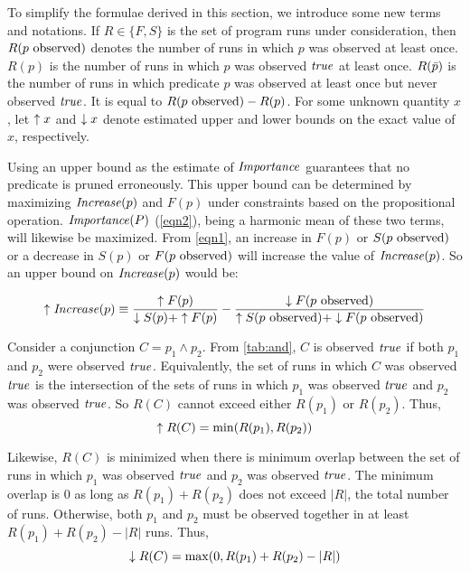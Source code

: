 To simplify the formulae derived in this section, we introduce some new terms and
notations.  If $R \in \{F, S\}$ is the set of program runs under consideration, then
$R(\text{$p$ observed})$ denotes the number of runs in which $p$ was observed at least
once.  $R(p)$ is the number of runs in which $p$ was observed $\mathit{true}$ at least once.
$R(\text{$\bar{p}$})$ is the number of runs in which predicate $p$ was observed
at least once but never observed $\mathit{true}$.  It is equal to $R(\text{$p$ observed}) - R(p)$.
For some unknown quantity $x$, let $\uparrow x$ and $\downarrow x$ denote estimated upper
and lower bounds on the exact value of $x$, respectively.

Using an upper bound as the estimate of $\mathit{Importance}$ guarantees that no
predicate is pruned erroneously.  This upper bound can be determined by maximizing
$\mathit{Increase}(p)$ and $F(p)$ under constraints based on the propositional operation.
$\mathit{Importance}(P)$ (\autoref{eqn2}), being a harmonic mean of these two terms, will
likewise be maximized.  From \autoref{eqn1}, an increase in $F(p)$ or $S(\text{$p$ observed})$
or a decrease in $S(p)$ or $F(\text{$p$ observed})$ will increase the value of $\mathit{Increase}(p)$.
So an upper bound on $\mathit{Increase}(p)$ would be:

\begin{equation}
\label{eqn3}
\uparrow\mathit{Increase}(p) \equiv
\frac{\uparrow F(p)}{\downarrow S(p) + \uparrow F(p)}
-
\frac{\downarrow F(\text{$p$ observed})}{\uparrow S(\text{$p$ observed}) + \downarrow F(\text{$p$ observed})}
\end{equation}

Consider a conjunction $C = p_1 \wedge p_2$.  From \autoref{tab:and}, $C$ is
observed $\mathit{true}$ if both $p_1$ and $p_2$ were observed $\mathit{true}$.  Equivalently, the set
of runs in which $C$ was observed $\mathit{true}$ is the intersection of the sets of
runs in which $p_1$ was observed $\mathit{true}$ and $p_2$ was observed $\mathit{true}$.  So
$R(C)$ cannot exceed either $R(p_1)$ or $R(p_2)$.  Thus,
\begin{equation}
  \uparrow R(C) = \min(R(p_1), R(p_2))
\end{equation}

Likewise, $R(C)$ is minimized when there is minimum overlap between the set
of runs in which $p_1$ was observed $\mathit{true}$ and $p_2$ was observed $\mathit{true}$.
The minimum overlap is $0$ as long as $R(p_1) + R(p_2)$ does not exceed $|R|$,
the total number of runs.  Otherwise, both $p_1$ and $p_2$ must be observed
together in at least $R(p_1) + R(p_2) - |R|$ runs.  Thus,
\begin{equation}
  \downarrow R(C) = \max(0, R(p_1) + R(p_2) - |R|)
\end{equation}

